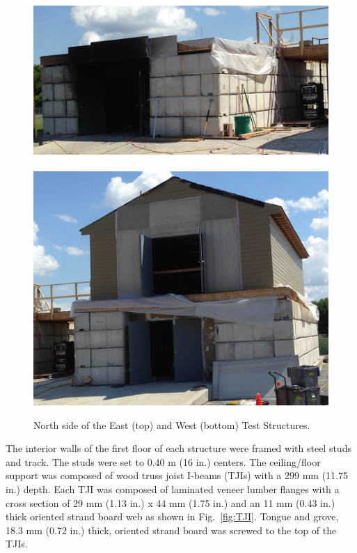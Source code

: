 \documentclass[12pt,oneside]{book}
\begin{document}
\begin{figure}[!ht]
\includegraphics[width=6in]{../../Hose_Stream_Report/Pictures/east_structure}
\\~\\
\includegraphics[width=6in]{../../Hose_Stream_Report/Pictures/west_structure}
\caption[North side of the East and West Structures.]{North side of the East (top) and West (bottom) Test Structures.}
\label{fig:struct_pics}
\end{figure}

The interior walls of the first floor of each structure were framed with steel studs and track. The studs were set to 0.40 m (16 in.) centers. The ceiling/floor support was composed of wood truss joist I-beams (TJIs) with a 299 mm (11.75 in.) depth. Each TJI was composed of laminated veneer lumber flanges with a cross section of 29 mm (1.13 in.) x 44 mm (1.75 in.) and an 11 mm (0.43 in.) thick oriented strand board web as shown in Fig.~\ref{fig:TJI}. Tongue and grove, 18.3 mm (0.72 in.) thick, oriented strand board was screwed to the top of the TJIs.
\end{document}
